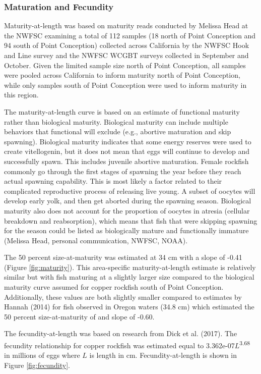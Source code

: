 \documentclass[11pt,
  english,
  letterpaper,
]{article}
\begin{document}
\hypertarget{maturation-and-fecundity}{%
\subsubsection{Maturation and Fecundity}\label{maturation-and-fecundity}}

Maturity-at-length was based on maturity reads conducted by Melissa Head at the NWFSC examining a total of 112 samples (18 north of Point Conception and 94 south of Point Conception) collected across California by the NWFSC Hook and Line survey and the NWFSC WCGBT surveys collected in September and October. Given the limited sample size north of Point Conception, all samples were pooled across California to inform maturity north of Point Conception, while only samples south of Point Conception were used to inform maturity in this region.

The maturity-at-length curve is based on an estimate of functional maturity rather than biological maturity. Biological maturity can include multiple behaviors that functional will exclude (e.g., abortive maturation and skip spawning). Biological maturity indicates that some energy reserves were used to create vitellogenin, but it does not mean that eggs will continue to develop and successfully spawn. This includes juvenile abortive maturation. Female rockfish commonly go through the first stages of spawning the year before they reach actual spawning capability. This is most likely a factor related to their complicated reproductive process of releasing live young. A subset of oocytes will develop early yolk, and then get aborted during the spawning season. Biological maturity also does not account for the proportion of oocytes in atresia (cellular breakdown and reabsorption), which means that fish that were skipping spawning for the season could be listed as biologically mature and functionally immature (Melissa Head, personal communication, NWFSC, NOAA).

The 50 percent size-at-maturity was estimated at 34 cm with a slope of -0.41 (Figure \ref{fig:maturity}). This area-specific maturity-at-length estimate is relatively similar but with fish maturing at a slightly larger size compared to the biological maturity curve assumed for copper rockfish south of Point Conception. Additionally, these values are both slightly smaller compared to estimates by Hannah (2014) for fish observed in Oregon waters (34.8 cm) which estimated the 50 percent size-at-maturity of and slope of -0.60.

The fecundity-at-length was based on research from Dick et al. (2017). The fecundity relationship for copper rockfish was estimated equal to 3.362e-07\(L\)\textsuperscript{3.68} in millions of eggs where \(L\) is length in cm. Fecundity-at-length is shown in Figure \ref{fig:fecundity}.
\end{document}
